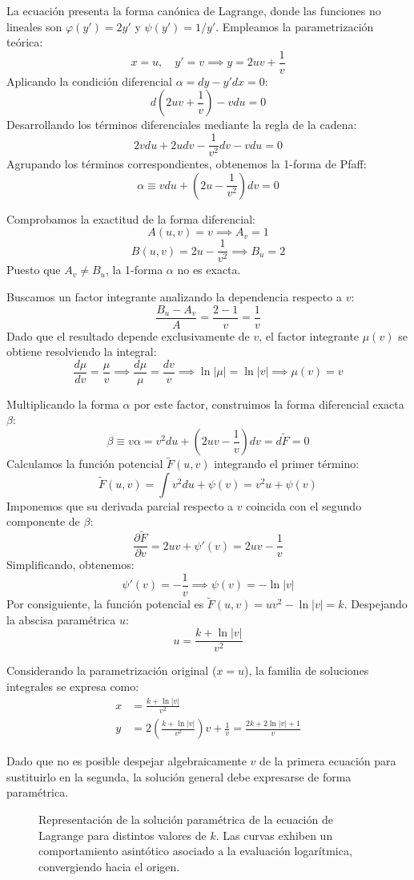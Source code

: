 \begin{tcolorbox}
La ecuación presenta la forma canónica de Lagrange, donde las funciones no lineales son $\varphi(y') = 2y'$ y $\psi(y') = 1/y'$. Empleamos la parametrización teórica:
$$ x = u, \quad y' = v \implies y = 2uv + \frac{1}{v} $$
Aplicando la condición diferencial $\alpha = dy - y'dx = 0$:
$$ d\left( 2uv + \frac{1}{v} \right) - v du = 0 $$
Desarrollando los términos diferenciales mediante la regla de la cadena:
$$ 2v du + 2u dv - \frac{1}{v^2}dv - v du = 0 $$
Agrupando los términos correspondientes, obtenemos la 1-forma de Pfaff:
$$ \alpha \equiv v du + \left( 2u - \frac{1}{v^2} \right)dv = 0 $$

Comprobamos la exactitud de la forma diferencial:
$$ A(u,v) = v \implies A_v = 1 $$
$$ B(u,v) = 2u - \frac{1}{v^2} \implies B_u = 2 $$
Puesto que $A_v \neq B_u$, la 1-forma $\alpha$ no es exacta. 

Buscamos un factor integrante analizando la dependencia respecto a $v$:
$$ \frac{B_u - A_v}{A} = \frac{2 - 1}{v} = \frac{1}{v} $$
Dado que el resultado depende exclusivamente de $v$, el factor integrante $\mu(v)$ se obtiene resolviendo la integral:
$$ \frac{d\mu}{dv} = \frac{\mu}{v} \implies \frac{d\mu}{\mu} = \frac{dv}{v} \implies \ln|\mu| = \ln|v| \implies \mu(v) = v $$

Multiplicando la forma $\alpha$ por este factor, construimos la forma diferencial exacta $\beta$:
$$ \beta \equiv v\alpha = v^2 du + \left( 2uv - \frac{1}{v} \right)dv = d\tilde{F} = 0 $$
Calculamos la función potencial $\tilde{F}(u,v)$ integrando el primer término:
$$ \tilde{F}(u,v) = \int v^2 du + \psi(v) = v^2 u + \psi(v) $$
Imponemos que su derivada parcial respecto a $v$ coincida con el segundo componente de $\beta$:
$$ \frac{\partial \tilde{F}}{\partial v} = 2uv + \psi'(v) = 2uv - \frac{1}{v} $$
Simplificando, obtenemos:
$$ \psi'(v) = -\frac{1}{v} \implies \psi(v) = -\ln|v| $$
Por consiguiente, la función potencial es $\tilde{F}(u,v) = u v^2 - \ln|v| = k$.
Despejando la abscisa paramétrica $u$:
$$ u = \frac{k + \ln|v|}{v^2} $$

Considerando la parametrización original ($x=u$), la familia de soluciones integrales se expresa como:
\begin{align*}
    x &= \frac{k + \ln|v|}{v^2} \\
    y &= 2\left(\frac{k + \ln|v|}{v^2}\right)v + \frac{1}{v} = \frac{2k + 2\ln|v| + 1}{v}
\end{align*}

Dado que no es posible despejar algebraicamente $v$ de la primera ecuación para sustituirlo en la segunda, la solución general debe expresarse de forma paramétrica.

\begin{figure}[H]
    \centering
    
    \caption{Representación de la solución paramétrica de la ecuación de Lagrange para distintos valores de $k$. Las curvas exhiben un comportamiento asintótico asociado a la evaluación logarítmica, convergiendo hacia el origen.}
\end{figure}
\end{tcolorbox}


